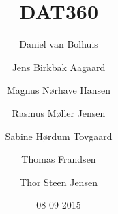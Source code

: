 

\title{DAT360}
\author{Daniel van Bolhuis \and Jens Birkbak Aagaard \and Magnus Nørhave Hansen \and Rasmus Møller Jensen \and Sabine Hørdum Tovgaard\and Thomas Frandsen \and Thor Steen Jensen}
\date{08-09-2015}



\frontmatter

\maketitle

\tableofcontents

\mainmatter

